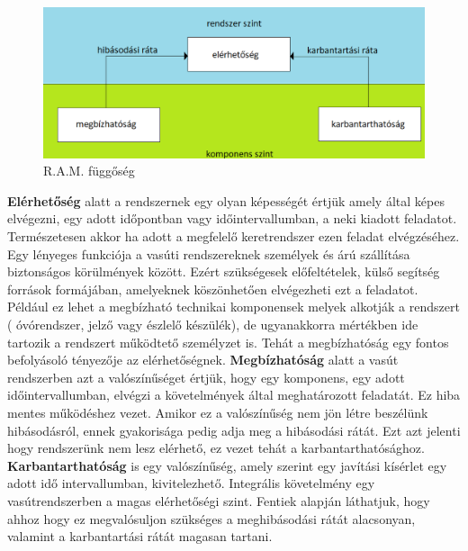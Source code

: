\documentclass[a4paper,12pt]{article}
\begin{document}
\begin{figure}[htp]
	\centering
    \includegraphics[width=\linewidth]{images/rams_dependency.png}
    \caption[R.A.M. függőség]{R.A.M. függőség}
    \label{fig:ram_dependency}
\end{figure}
\textbf{Elérhetőség} alatt a rendszernek egy olyan képességét értjük amely által képes elvégezni, egy adott időpontban vagy időintervallumban, a neki kiadott feladatot.
Természetesen akkor ha adott a megfelelő keretrendszer ezen feladat elvégzéséhez.
Egy lényeges funkciója a vasúti rendszereknek személyek és árú szállítása biztonságos körülmények között.
Ezért szükségesek előfeltételek, külső segítség források formájában, amelyeknek köszönhetően elvégezheti ezt a feladatot.
Például ez lehet a megbízható technikai komponensek melyek alkotják a rendszert ( óvórendszer, jelző vagy észlelő készülék), de ugyanakkorra mértékben ide tartozik a rendszert működtető személyzet is. 
Tehát a megbízhatóság egy fontos befolyásoló tényezője az elérhetőségnek. 
\textbf{Megbízhatóság} alatt a vasút rendszerben azt a valószínűséget értjük, hogy egy komponens, egy adott időintervallumban, elvégzi a követelmények által meghatározott feladatát.
Ez hiba mentes működéshez vezet. Amikor ez a valószínűség nem jön létre beszélünk hibásodásról, ennek gyakorisága pedig adja meg a hibásodási rátát.
Ezt azt jelenti hogy rendszerünk nem lesz elérhető, ez vezet tehát a karbantarthatósághoz.
\textbf{Karbantarthatóság} is egy valószínűség, amely szerint egy javítási kísérlet egy adott idő intervallumban, kivitelezhető.
Integrális követelmény egy vasútrendszerben a magas elérhetőségi szint. 
Fentiek alapján láthatjuk, hogy ahhoz hogy ez megvalósuljon szükséges a meghibásodási rátát alacsonyan, valamint a karbantartási rátát magasan tartani.
\end{document}
